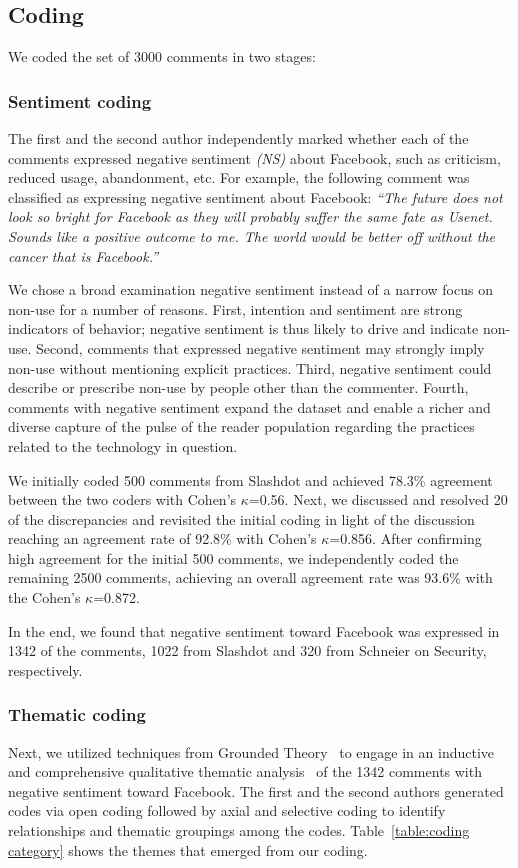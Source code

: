 \subsection{Coding}
We coded the set of 3000 comments in two stages:

\subsubsection{Sentiment coding}
The first and the second author independently marked whether each of the comments expressed negative sentiment \emph{(NS)} about Facebook, such as criticism, reduced usage, abandonment, etc. For example, the following comment was classified as expressing negative sentiment about Facebook: \textit{``The future does not look so bright for Facebook as they will probably suffer the same fate as Usenet. Sounds like a positive outcome to me. The world would be better off without the cancer that is Facebook.''}

We chose a broad examination negative sentiment instead of a narrow focus on non-use for a number of reasons. First, intention and sentiment are strong indicators of behavior; negative sentiment is thus likely to drive and indicate non-use. Second, comments that expressed negative sentiment may strongly imply non-use without mentioning explicit practices. Third, negative sentiment could describe or prescribe non-use by people other than the commenter. Fourth, comments with negative sentiment expand the dataset and enable a richer and diverse capture of the pulse of the reader population regarding the practices related to the technology in question.

We initially coded 500 comments from Slashdot and achieved 78.3\% agreement between the two coders with Cohen's $\kappa$=0.56. Next, we discussed and resolved 20 of the discrepancies and revisited the initial coding in light of the discussion reaching an agreement rate of 92.8\% with Cohen's $\kappa$=0.856. After confirming high agreement for the initial 500 comments, we independently coded the remaining 2500 comments, achieving an overall agreement rate was 93.6\% with the Cohen's $\kappa$=0.872.

In the end, we found that negative sentiment toward Facebook was expressed in 1342 of the comments, 1022 from Slashdot and 320 from Schneier on Security, respectively.

\subsubsection{Thematic coding}
Next, we utilized techniques from Grounded Theory~\cite{draucker2007theoretical} to engage in an inductive and comprehensive qualitative thematic analysis~\cite{joffe2004content} of the 1342 comments with negative sentiment toward Facebook. The first and the second authors generated codes via open coding followed by axial and selective coding to identify relationships and thematic groupings among the codes. Table~\ref{table:coding category} shows the themes that emerged from our coding.


